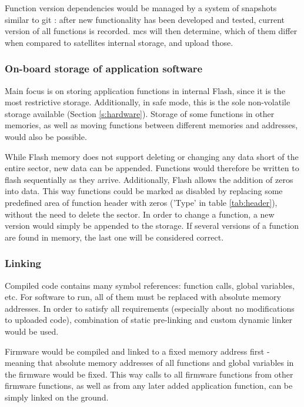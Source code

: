 Function version dependencies would be managed by a system of snapshots similar to git \cite[Chapter~1.3]{Chacon2018}: after new functionality has been developed and tested, current version of all functions is recorded. \Gls{mcs} will then determine, which of them differ when compared to satellites internal storage, and upload those.

\subsubsection{On-board storage of application software}

Main focus is on storing application functions in internal Flash, since it is the most restrictive storage. Additionally, in safe mode, this is the sole non-volatile storage available (Section \ref{s:hardware}). Storage of some functions in other memories, as well as moving functions between different memories and addresses, would also be possible.

While Flash memory does not support deleting or changing any data short of the entire sector, new data can be appended. Functions would therefore be written to flash sequentially as they arrive. Additionally, Flash allows the addition of zeros into data. This way functions could be marked as disabled by replacing some predefined area of function header with zeros ('Type' in table \ref{tab:header}), without the need to delete the sector. In order to change a function, a new version would simply be appended to the storage. If several versions of a function are found in memory, the last one will be considered correct.

\subsubsection{Linking}

Compiled code contains many symbol references: function calls, global variables, etc. For software to run, all of them must be replaced with absolute memory addresses. In order to satisfy all requirements (especially about no modifications to uploaded code), combination of static pre-linking and custom dynamic linker would be used.

Firmware would be compiled and linked to a fixed memory address first - meaning that absolute memory addresses of all functions and global variables in the firmware would be fixed. This way calls to all firmware functions from other firmware functions, as well as from any later added application function, can be simply linked on the ground.

